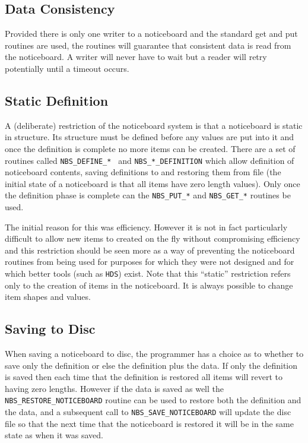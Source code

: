 \documentclass[twoside,11pt,nolof]{starlink}
\begin{document}
      \subsection {Data Consistency} Provided there is only one writer to a
      noticeboard and the standard get and put routines are used, the routines
      will guarantee that consistent data is read from the noticeboard. A
      writer will never have to wait but a reader will retry potentially until
      a timeout occurs.

      \subsection {Static Definition} A (deliberate) restriction of the
      noticeboard system is that a noticeboard is static in structure. Its
      structure must be defined before any values are put into it and once the
      definition is complete no more items can be created. There are a set of
      routines called \texttt{NBS\_DEFINE\_* } and \texttt{NBS\_*\_DEFINITION}
      which allow definition
      of noticeboard contents, saving definitions to and restoring them from
      file (the initial state of a noticeboard is that all items have zero
      length values). Only once the definition phase is complete can the
      \texttt{NBS\_PUT\_*} and \texttt{NBS\_GET\_*} routines be used.

      The initial reason for this was efficiency. However it is not in fact
      particularly difficult to allow new items to created on the fly without
      compromising efficiency and this restriction should be seen more as a way
      of preventing the noticeboard routines from being used for purposes for
      which they were not designed and for which better tools (such as
      \texttt{HDS}) exist. Note that this ``static'' restriction refers only to
      the creation of
      items in the noticeboard. It is always possible to change item shapes and
      values.

      \subsection {Saving to Disc} When saving a noticeboard to disc, the
      programmer has a choice as to whether to save only the definition
      or else the definition plus the data. If only the definition is saved
      then each time that the definition is restored
      all items will revert to having zero lengths. However if the data
      is saved as well the \texttt{NBS\_RESTORE\_NOTICEBOARD} routine can be used
      to restore both the definition and the data, and a subsequent call
      to \texttt{NBS\_SAVE\_NOTICEBOARD} will update the disc file so that
      the next
      time that the noticeboard is restored it will be in the same state
      as when it was saved.
\end{document}
